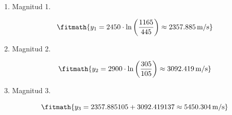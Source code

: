 \begin{enumerate}

\item Magnitud 1.

\[\fitmath{y_{1}=2450\cdot \ln\left(\frac{1165}{445}\right)\approx 2357.885\,\mathrm{m/s}}\]

\item Magnitud 2.

\[\fitmath{y_{2}=2900\cdot \ln\left(\frac{305}{105}\right)\approx 3092.419\,\mathrm{m/s}}\]

\item Magnitud 3.

\[\fitmath{y_{3}=2357.885105+3092.419137\approx 5450.304\,\mathrm{m/s}}\]

\end{enumerate}
